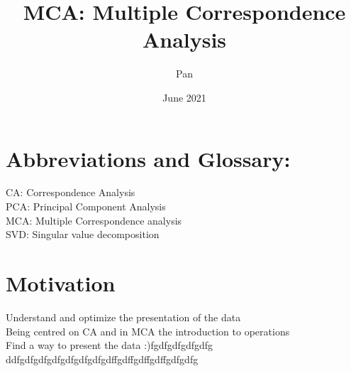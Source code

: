\documentclass[12pt]{extarticle}
\title{MCA: Multiple Correspondence Analysis}
\author{Pan }
\date{June 2021}
\numberwithin{equation}{section}
\begin{document}
\maketitle
\section{Abbreviations and Glossary:}
CA: Correspondence Analysis \\
PCA: Principal Component Analysis \\
MCA: Multiple Correspondence analysis \\
SVD: Singular value decomposition \\

\section{Motivation}
Understand and optimize the presentation of the data\\
Being centred on CA and in MCA the introduction to operations\\ 
Find a way to present the data :)fgdfgdfgdfgdfg
ddfgdfgdfgdfgdfgdfgdfgdffgdffgdffgdffgdfgdfg
\end{document}
